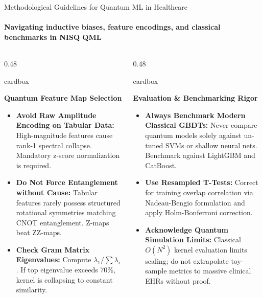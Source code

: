 \documentclass[aspectratio=169, 10pt]{beamer}
\newcommand{\cardbox}[3]{%
  \begin{beamercolorbox}[wd=\linewidth,rounded=true,sep=2.5pt]{cardbox}%
    {\bfseries\scriptsize\color{#1}#2\par}\vspace*{1pt}%
    {\footnotesize #3}%
  \end{beamercolorbox}%
}
\begin{document}
\begin{frame}{Methodological Guidelines for Quantum ML in Healthcare}
  \framesubtitle{Navigating inductive biases, feature encodings, and classical benchmarks in NISQ QML}

  \begin{columns}[T]
    \begin{column}{0.48\textwidth}
      \cardbox{DeepPurple}{Quantum Feature Map Selection}{
        \begin{itemize}\setlength\itemsep{1pt}\scriptsize
          \item \textbf{Avoid Raw Amplitude Encoding on Tabular Data:} High-magnitude features cause rank-1 spectral collapse. Mandatory z-score normalization is required.
          \item \textbf{Do Not Force Entanglement without Cause:} Tabular features rarely possess structured rotational symmetries matching CNOT entanglement. Z-maps beat ZZ-maps.
          \item \textbf{Check Gram Matrix Eigenvalues:} Compute $\lambda_1 / \sum \lambda_i$. If top eigenvalue exceeds 70\%, kernel is collapsing to constant similarity.
        \end{itemize}
      }
    \end{column}

    \begin{column}{0.48\textwidth}
      \cardbox{TealAccent}{Evaluation \& Benchmarking Rigor}{
        \begin{itemize}\setlength\itemsep{1pt}\scriptsize
          \item \textbf{Always Benchmark Modern Classical GBDTs:} Never compare quantum models solely against un-tuned SVMs or shallow neural nets. Benchmark against LightGBM and CatBoost.
          \item \textbf{Use Resampled T-Tests:} Correct for training overlap correlation via Nadeau-Bengio formulation and apply Holm-Bonferroni correction.
          \item \textbf{Acknowledge Quantum Simulation Limits:} Classical $O(N^2)$ kernel evaluation limits scaling; do not extrapolate toy-sample metrics to massive clinical EHRs without proof.
        \end{itemize}
      }
    \end{column}
  \end{columns}
\end{frame}
\end{document}
